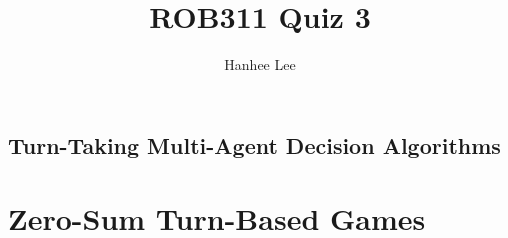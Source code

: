 \documentclass{article}
\title{ROB311 Quiz 3}
\author{Hanhee Lee}
\begin{document}
\maketitle

\tableofcontents
\newpage

\begin{center}
    \section*{Turn-Taking Multi-Agent Decision Algorithms}
\end{center}
\section{Zero-Sum Turn-Based Games}

\newpage
\end{document}
